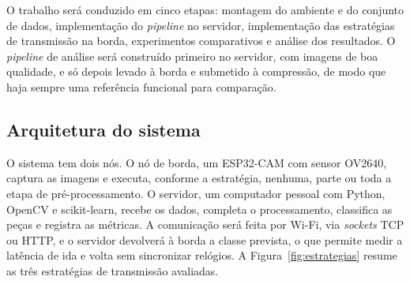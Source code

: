 \documentclass[12pt]{article}
\begin{document}
O trabalho será conduzido em cinco etapas: montagem do ambiente e do conjunto de dados, implementação do \textit{pipeline} no servidor, implementação das estratégias de transmissão na borda, experimentos comparativos e análise dos resultados. O \textit{pipeline} de análise será construído primeiro no servidor, com imagens de boa qualidade, e só depois levado à borda e submetido à compressão, de modo que haja sempre uma referência funcional para comparação.

\subsection{Arquitetura do sistema}

O sistema tem dois nós. O nó de borda, um ESP32-CAM com sensor OV2640, captura as imagens e executa, conforme a estratégia, nenhuma, parte ou toda a etapa de pré-processamento. O servidor, um computador pessoal com Python, OpenCV e scikit-learn, recebe os dados, completa o processamento, classifica as peças e registra as métricas. A comunicação será feita por Wi-Fi, via \textit{sockets} TCP ou HTTP, e o servidor devolverá à borda a classe prevista, o que permite medir a latência de ida e volta sem sincronizar relógios. A Figura~\ref{fig:estrategias} resume as três estratégias de transmissão avaliadas.
\end{document}
